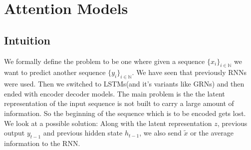 \chapterspaceabove{6.25cm} %
\chapterspacebelow{8.5cm} %


\chapter{Attention Models}

\section{Intuition}
We formally define the problem to be one where given a sequence $\{x_i\}_{i\in\mathbb N}$ we want to predict another sequence $\{y_i\}_{i\in\mathbb N}$. We have seen that previously RNNs were used. Then we switched to LSTMs(and it's variants like GRNs) and then ended with encoder decoder models. The main problem is the the latent representation of the input sequence is not built to carry a large amount of information. So the beginning of the sequence which is to be encoded gets lost. We look at a possible solution: Along with the latent  representation $z$, previous output $y_{t-1}$ and previous hidden state $h_{t-1}$, we also send $\tilde x$ or the average information to the RNN. 